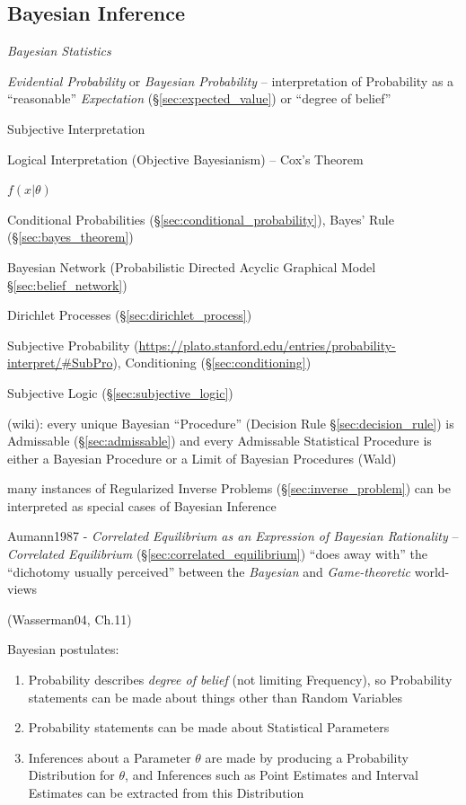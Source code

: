 \subsection{Bayesian Inference}\label{sec:bayesian_inference}

\emph{Bayesian Statistics}

\emph{Evidential Probability} or \emph{Bayesian Probability} -- interpretation
of Probability as a ``reasonable'' \emph{Expectation}
(\S\ref{sec:expected_value}) or ``degree of belief''

Subjective Interpretation

Logical Interpretation (Objective Bayesianism) -- Cox's Theorem

$f(x | \theta)$

Conditional Probabilities (\S\ref{sec:conditional_probability}), Bayes' Rule
(\S\ref{sec:bayes_theorem})

\fist Bayesian Network (Probabilistic Directed Acyclic Graphical Model
\S\ref{sec:belief_network})

\fist Dirichlet Processes (\S\ref{sec:dirichlet_process})

Subjective Probability %
(\url{https://plato.stanford.edu/entries/probability-interpret/#SubPro}),
Conditioning (\S\ref{sec:conditioning})

\fist Subjective Logic (\S\ref{sec:subjective_logic})

(wiki): every unique Bayesian ``Procedure'' (Decision Rule
\S\ref{sec:decision_rule}) is Admissable (\S\ref{sec:admissable}) and every
Admissable Statistical Procedure is either a Bayesian Procedure or a Limit of
Bayesian Procedures (Wald)

many instances of Regularized Inverse Problems (\S\ref{sec:inverse_problem}) can
be interpreted as special cases of Bayesian Inference

\fist Aumann1987 - \emph{Correlated Equilibrium as an Expression of Bayesian
  Rationality} -- \emph{Correlated Equilibrium}
(\S\ref{sec:correlated_equilibrium}) ``does away with'' the ``dichotomy usually
perceived'' between the \emph{Bayesian} and \emph{Game-theoretic} world-views

(Wasserman04, Ch.11)

Bayesian postulates:
\begin{enumerate}
  \item Probability describes \emph{degree of belief} (not limiting Frequency),
    so Probability statements can be made about things other than Random
    Variables
  \item Probability statements can be made about Statistical Parameters
  \item Inferences about a Parameter $\theta$ are made by producing a
    Probability Distribution for $\theta$, and Inferences such as Point
    Estimates and Interval Estimates can be extracted from this Distribution
\end{enumerate}

